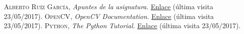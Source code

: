 \begin{thebibliography}{aaaa}
 \textsc{Alberto Ruíz García}, \textit{Apuntes de la asignatura.} \href{http://dis.um.es/~alberto/vision.html}{\color{blue}\underline{Enlace}} (última visita 23/05/2017).
 \textsc{OpenCV}, \textit{OpenCV Documentation.} \href{http://docs.opencv.org/2.4/}{\color{blue}\underline{Enlace}} (última visita 23/05/2017).
 \textsc{Python}, \textit{The Python Tutorial.} \href{https://docs.python.org/2/tutorial/}{\color{blue}\underline{Enlace}} (última visita 23/05/2017).
\end{thebibliography}